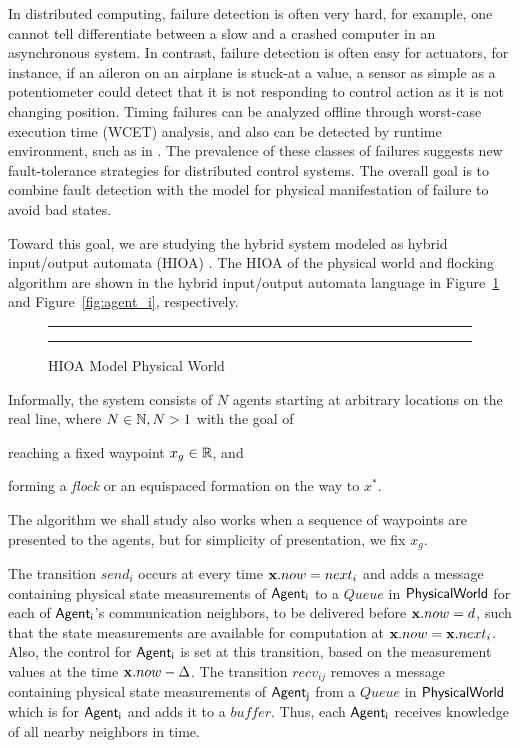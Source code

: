 \documentclass[10pt, conference]{IEEEtran}
\begin{document}
In distributed computing, failure detection is often very hard, for example, one cannot tell differentiate between a slow and a crashed computer in an asynchronous system.
%
In contrast, failure detection is often easy for actuators, for instance, if an aileron on an airplane is stuck-at a value, a sensor as simple as a potentiometer could detect that it is not responding to control action as it is not changing position.
%
Timing failures can be analyzed offline through worst-case execution time (WCET) analysis, and also can be detected by runtime environment, such as in \cite{HenzingerGiotto2001}.
%
The prevalence of these classes of failures suggests new fault-tolerance strategies for distributed control systems.
%
The overall goal is to combine fault detection with the model for physical manifestation of failure to avoid bad states.

Toward this goal, we are studying the hybrid system modeled as hybrid input/output automata (HIOA) \cite{lynchSV2003}.  The HIOA of the physical world and flocking algorithm are shown in the hybrid input/output automata language \cite{mitra01masters} in Figure~\ref{fig:physicalWorld} and Figure~\ref{fig:agent_i}, respectively.

\begin{figure}[h!]
\centering
  \hrule
  {}
  \hrule
  \caption{HIOA Model Physical World}
  \label{fig:physicalWorld}
\end{figure}

%
Informally, the system consists of $N$ agents starting at arbitrary locations on the real line, where $N \in \naturals, N > 1$ with the goal of 
\begin{inparaenum}[(a)]
\item reaching a fixed waypoint $x_g \in \reals$, and 
\item forming a {\em flock\/} or an equispaced formation on the way to $x^*$.
\end{inparaenum}  
The algorithm we shall study also works when a sequence of waypoints are presented to the agents, but for simplicity of presentation, we fix $x_g$.

The transition $send_i$ occurs at every time ${\bf x}.now = next_i$ and adds a message containing physical state measurements of ${\operatorname{\mathsf{Agent_i}}}$ to a $Queue$ in ${\operatorname{\mathsf{PhysicalWorld}}}$ for each of ${\operatorname{\mathsf{Agent_i}}}$'s communication neighbors, to be delivered before ${\bf x}.now = d$, such that the state measurements are available for computation at ${\bf x}.now = {\bf x}.next_i$.  Also, the control for ${\operatorname{\mathsf{Agent_i}}}$ is set at this transition, based on the measurement values at the time ${\bf x}.now - \Delta$.
%
The transition $recv_{ij}$ removes a message containing physical state measurements of ${\operatorname{\mathsf{Agent_j}}}$ from a $Queue$ in ${\operatorname{\mathsf{PhysicalWorld}}}$ which is for ${\operatorname{\mathsf{Agent_i}}}$ and adds it to a $\mathit{buffer}$.
%
Thus, each ${\operatorname{\mathsf{Agent_i}}}$ receives knowledge of all nearby neighbors in time.
\end{document}

